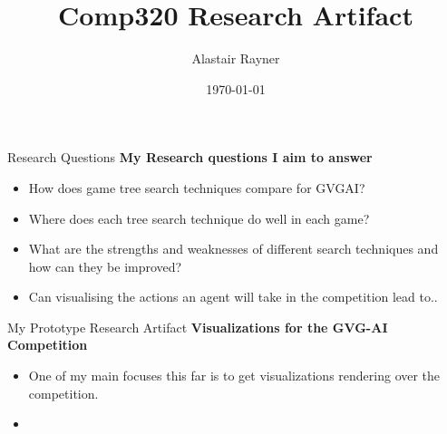 \documentclass{beamer}
\title{Comp320 Research Artifact}
\author{Alastair Rayner}
\date{\today}
\begin{document}
\maketitle


\begin{frame}{Research Questions}
	\textbf{My Research questions I aim to answer}
	
	\begin{itemize}
    		\item How does game tree search techniques compare for GVGAI? \pause
    		\item Where does each tree search technique do well in each game? \pause 
    		\item What are the strengths and weaknesses of different search techniques and how can they be improved? \pause
	\end{itemize}
	
	\begin{itemize}
		\item Can visualising the actions an agent will take in the competition lead to..
	\end{itemize}
\end{frame}






\begin{frame}{My Prototype Research Artifact}
	\textbf{Visualizations for the GVG-AI Competition} \pause
		\begin{itemize}
			\item One of my main focuses this far is to get visualizations rendering over the competition.
			\item 
		\end{itemize}
\end{frame}
\end{document}
